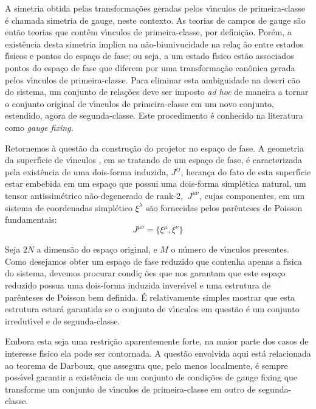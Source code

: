 \documentclass[a4paper,thmsa,12pt]{report}
\begin{document}
A simetria obtida pelas transforma\c{c}\~{o}es geradas pelos v\'{\i}nculos
de primeira-classe \'{e} chamada simetria de gauge, neste contexto. As
teorias de campos de gauge s\~{a}o ent\~{a}o teorias que cont\^{e}m
v\'{\i}nculos de primeira-classe, por defini\c{c}\~{a}o. Por\'{e}m, a
exist\^{e}ncia desta simetria implica na n\~{a}o-biunivucidade na rela\c{c}%
\~{a}o entre estados f\'{\i}sicos e pontos do espa\c{c}o de fase; ou seja, a
um estado f\'{\i}sico est\~{a}o associados pontos do espa\c{c}o de fase que
diferem por uma transforma\c{c}\~{a}o can\^{o}nica gerada pelos
v\'{\i}nculos de primeira-classe. Para eliminar esta ambiguidade na descri\c{%
c}\~{a}o do sistema, um conjunto de rela\c{c}\~{o}es deve ser imposto 
\textit{ad hoc }de maneira a tornar o conjunto original de v\'{\i}nculos de
primeira-classe em um novo conjunto, estendido, agora de segunda-classe.
Este procedimento \'{e} conhecido na literatura como \textit{gauge fixing.}

Retornemos \`{a} quest\~{a}o da constru\c{c}\~{a}o do projetor no espa\c{c}o
de fase. A geometria da superf\'{\i}cie de v\'{\i}nculos \cite{teitelboim},
em se tratando de um espa\c{c}o de fase, \'{e} caracterizada pela
exist\^{e}ncia de uma dois-forma induzida, $J^{ij}$, heran\c{c}a do fato de
esta superf\'{\i}cie estar embebida em um espa\c{c}o que possui uma
dois-forma simpl\'{e}tica natural, um tensor antissim\'{e}trico
n\~{a}o-degenerado de rank-2, $\ J^{\mu \nu }$, cujas componentes, em um
sistema de coordenadas simpl\'{e}tico $\xi ^{\lambda }$ s\~{a}o fornecidas
pelos par\^{e}nteses de Poisson fundamentais: 
\begin{equation}
J^{\mu \nu }=\{\xi ^{\mu },\xi ^{\nu }\}  \label{11}
\end{equation}

Seja $2N$ a dimens\~{a}o do espa\c{c}o original, e $M$ o n\'{u}mero de
v\'{\i}nculos presentes. Como desejamos obter um espa\c{c}o de fase reduzido
que contenha apenas a f\'{\i}sica do sistema, devemos procurar condi\c{c}%
\~{o}es que nos garantam que este espa\c{c}o reduzido possua uma dois-forma
induzida invers\'{\i}vel e uma estrutura de par\^{e}nteses de Poisson bem
definida. \'{E} relativamente simples mostrar \cite{teitelboim} que esta
estrutura estar\'{a} garantida se o conjunto de v\'{\i}nculos em quest\~{a}o
\'{e} um conjunto irredut\'{\i}vel e de segunda-classe.

Embora esta seja uma restri\c{c}\~{a}o aparentemente forte, na maior parte
dos casos de interesse f\'{\i}sico ela pode ser contornada. A quest\~{a}o
envolvida aqui est\'{a} relacionada ao teorema de Darboux, que assegura que,
pelo menos localmente, \'{e} sempre poss\'{\i}vel garantir a exist\^{e}ncia
de um conjunto de condi\c{c}\~{o}es de gauge fixing que transforme um
conjunto de v\'{\i}nculos de primeira-classe em outro de segunda-classe.
\end{document}
